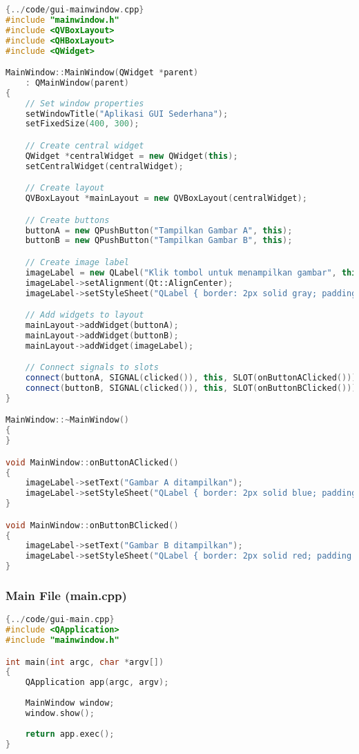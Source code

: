 \begin{lstlisting}[language=c++, caption=Source file untuk aplikasi GUI, label=gui-source]{../code/gui-mainwindow.cpp}
#include "mainwindow.h"
#include <QVBoxLayout>
#include <QHBoxLayout>
#include <QWidget>

MainWindow::MainWindow(QWidget *parent)
    : QMainWindow(parent)
{
    // Set window properties
    setWindowTitle("Aplikasi GUI Sederhana");
    setFixedSize(400, 300);

    // Create central widget
    QWidget *centralWidget = new QWidget(this);
    setCentralWidget(centralWidget);

    // Create layout
    QVBoxLayout *mainLayout = new QVBoxLayout(centralWidget);

    // Create buttons
    buttonA = new QPushButton("Tampilkan Gambar A", this);
    buttonB = new QPushButton("Tampilkan Gambar B", this);

    // Create image label
    imageLabel = new QLabel("Klik tombol untuk menampilkan gambar", this);
    imageLabel->setAlignment(Qt::AlignCenter);
    imageLabel->setStyleSheet("QLabel { border: 2px solid gray; padding: 10px; }");

    // Add widgets to layout
    mainLayout->addWidget(buttonA);
    mainLayout->addWidget(buttonB);
    mainLayout->addWidget(imageLabel);

    // Connect signals to slots
    connect(buttonA, SIGNAL(clicked()), this, SLOT(onButtonAClicked()));
    connect(buttonB, SIGNAL(clicked()), this, SLOT(onButtonBClicked()));
}

MainWindow::~MainWindow()
{
}

void MainWindow::onButtonAClicked()
{
    imageLabel->setText("Gambar A ditampilkan");
    imageLabel->setStyleSheet("QLabel { border: 2px solid blue; padding: 10px; background-color: lightblue; }");
}

void MainWindow::onButtonBClicked()
{
    imageLabel->setText("Gambar B ditampilkan");
    imageLabel->setStyleSheet("QLabel { border: 2px solid red; padding: 10px; background-color: lightcoral; }");
}
\end{lstlisting}

\subsubsection{Main File (main.cpp)}

\begin{lstlisting}[language=c++, caption=Main file untuk aplikasi GUI, label=gui-main]{../code/gui-main.cpp}
#include <QApplication>
#include "mainwindow.h"

int main(int argc, char *argv[])
{
    QApplication app(argc, argv);
    
    MainWindow window;
    window.show();
    
    return app.exec();
}
\end{lstlisting}

